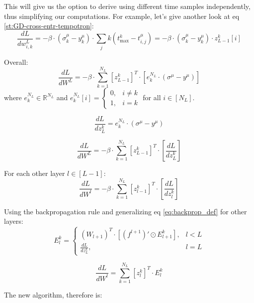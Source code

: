 This will give us the option to derive using different time samples independently, thus simplifying our computations. For example, let's give another look at eq \ref{st:GD-cross-entr-tempotron}:
\begin{equation}
\frac{dL}{dw_{i,k}^L} = -\beta \cdot (\sigma_k^\mu - y_k^\mu) \cdot \sum_j k(t_{\text{max}}^k - t_{i,j}^\mu) = -\beta \cdot (\sigma_k^\mu - y_k^\mu) \cdot z_{L-1}^k[i]
\end{equation}

Overall:
\begin{equation}
\frac{dL}{dW^L} = -\beta \cdot \sum_{k=1}^{N_L} [z_{L-1}^k]^T \cdot [e_k^{N_L} \cdot (\sigma^\mu - y^\mu)]
\end{equation}
where \(e_k^{N_L} \in \mathbb{R}^{N_L}\) and \(e_k^{N_L}[i] = \begin{cases} 0, & i \neq k \\ 1, & i = k \end{cases}\) for all \(i \in [N_L]\).

\begin{equation}
\frac{dL}{dz_L^k} = e_k^{N_L} \cdot (\sigma^\mu - y^\mu)
\end{equation}

\begin{equation}
\frac{dL}{dW^L} = -\beta \cdot \sum_{k=1}^{N_L} [z_{L-1}^k]^T \cdot \left[\frac{dL}{dz_L^k}\right]
\end{equation}

For each other layer \(l \in [L-1]\):
\begin{equation}
\frac{dL}{dW^l} = -\beta \cdot \sum_{k=1}^{N_L} [z_{l-1}^k]^T \cdot \left[\frac{dL}{dz_l^k}\right]
\end{equation}

Using the backpropagation rule and generalizing eq \ref{eq:backprop_def} for other layers:
\begin{equation}
E_l^k = \begin{cases} (W_{l+1})^T \cdot [(f^{l+1})' \odot E_{l+1}^k], & l < L \\ \frac{dL}{dz_L^k}, & l = L \end{cases}
\end{equation}

\begin{equation}
\frac{dL}{dW^l} = \sum_{k=1}^{N_L} [z_l^k]^T \cdot E_l^k
\end{equation}

The new algorithm, therefore is:

